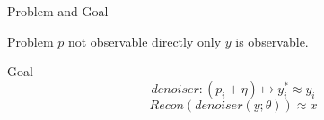\begin{frame}{Problem and Goal}
    
    \begin{block}{Problem}
        $p$ not observable directly only $y$ is observable.
    \end{block}

    \pause
    \begin{block}{Goal}
        $$ denoiser:   (p_i + \eta) \mapsto y_i^* \approx y_i $$
        \pause
        $$ \textit{Recon} \left( denoiser(y; \theta) \right) \approx x $$
    \end{block}

\end{frame}


